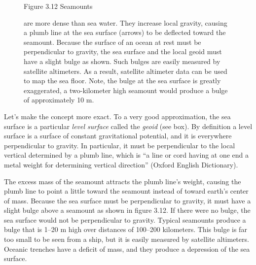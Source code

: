 \begin{figure} [t!]
{{\begin{minipage}{11.5cm}
\vspace{5ex}
\footnotesize
Figure 3.12 Seamounts \rule{0mm}{6ex}are more dense than sea
water. They increase local gravity, causing a plumb line at the sea
surface (arrows) to be deflected toward the seamount. Because the
surface of an ocean at rest must be perpendicular to gravity, the sea
surface and the local geoid must have a slight bulge as
shown. Such bulges are easily measured by satellite altimeters.  As a
result, satellite altimeter data can be used to map the sea
floor. Note, the bulge at the sea surface is greatly exaggerated, a
two-kilometer high seamount would produce a bulge of approximately 10 m.
\label{fig:geoidsketch}
\vspace{0.7ex}
\end{minipage}
}}
\vspace{-4ex}
\end{figure}

Let's make the concept more exact. To a very good approximation, the
sea surface is a particular \textit{level surface} called the \textit{geoid} (see box). By definition a
level surface is a surface of constant gravitational potential, and it
is everywhere perpendicular to gravity. In particular, it must be
perpendicular to the local vertical determined by a plumb line, which
is ``a line or cord having at one end a metal weight for determining
vertical direction'' (Oxford English Dictionary).

The excess mass of the seamount attracts the plumb line's weight,
causing the plumb line to point a little toward the seamount instead
of toward earth's center of mass. Because the sea surface must be
perpendicular to gravity, it must have a slight bulge above a seamount
as shown in figure 3.12. If there were no bulge, the sea surface would
not be perpendicular to gravity. Typical seamounts produce a bulge
that is 1--20 m high over distances of 100--200 kilometers.  This
bulge is far too small to be seen from a ship, but it is easily
measured by satellite altimeters. Oceanic trenches have a deficit of
mass, and they produce a depression of the sea surface.

